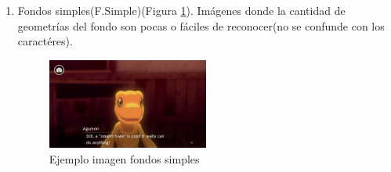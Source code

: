 \begin{enumerate}
	\item Fondos simples(F.Simple)(Figura \ref{fig:Fsimple}). Imágenes donde la cantidad de geometrías del fondo son pocas o fáciles de reconocer(no se confunde con los caractéres).
	\begin{figure}[H]
		\centering
		\includegraphics[width = 0.5\textwidth]{Imagenes/OCR/Simple.png}
		\caption{Ejemplo imagen fondos simples }
		\label{fig:Fsimple}
	\end{figure}
	

\end{enumerate}
